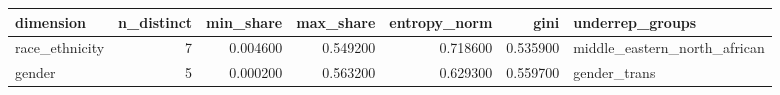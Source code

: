 \begin{tabular}{lrrrrrl}
\toprule
dimension & n_distinct & min_share & max_share & entropy_norm & gini & underrep_groups \\
\midrule
race_ethnicity & 7 & 0.004600 & 0.549200 & 0.718600 & 0.535900 & middle_eastern_north_african \\
gender & 5 & 0.000200 & 0.563200 & 0.629300 & 0.559700 & gender_trans \\
\bottomrule
\end{tabular}
